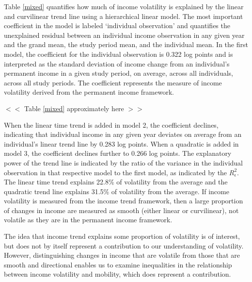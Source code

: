 \documentclass[12pt]{article}
\begin{document}
Table \ref{mixed} quantifies how much of income volatility is explained by the linear and curvilinear trend line using a hierarchical linear model. The most important coefficient in the model is labeled `individual observation' and quantifies the unexplained residual between an individual income observation in any given year and the grand mean, the study period mean, and the individual mean. In the first model, the coefficient for the individual observation is 0.322 log points and is interpreted as the standard deviation of income change from an individual's permanent income in a given study period, on average, across all individuals, across all study periods. The coefficient represents the measure of income volatility derived from the permanent income framework.
\begin{center}
$<<$ Table \ref{mixed} approximately here $>>$ 
\end{center}
When the linear time trend is added in model 2, the coefficient declines, indicating that individual income in any given year deviates on average from an individual's linear trend line by 0.283 log points. When a quadratic is added in model 3, the coefficient declines further to 0.266 log points. The explanatory power of the trend line is indicated by the ratio of the variance in the individual observation in that respective model to the first model, as indicated by the $R_{\epsilon}^2$. The linear time trend explains 22.8\% of volatility from the average and the quadratic trend line explains 31.5\% of volatility from the average. If income volatility is measured from the income trend framework, then a large proportion of changes in income are measured as smooth (either linear or curvilinear), not volatile as they are in the permanent income framework.

The idea that income trend explains some proportion of volatility is of interest, but does not by itself represent a contribution to our understanding of volatility. However, distinguishing changes in income that are volatile from those that are smooth and directional enables us to examine inequalities in the relationship between income volatility and mobility, which does represent a contribution. 
\end{document}
